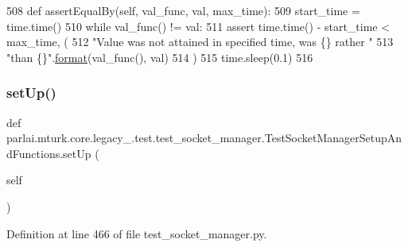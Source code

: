 \begin{DoxyCode}
508     \textcolor{keyword}{def }assertEqualBy(self, val\_func, val, max\_time):
509         start\_time = time.time()
510         \textcolor{keywordflow}{while} val\_func() != val:
511             \textcolor{keyword}{assert} time.time() - start\_time < max\_time, (
512                 \textcolor{stringliteral}{"Value was not attained in specified time, was \{\} rather "}
513                 \textcolor{stringliteral}{"than \{\}"}.\hyperlink{namespaceparlai_1_1chat__service_1_1services_1_1messenger_1_1shared__utils_a32e2e2022b824fbaf80c747160b52a76}{format}(val\_func(), val)
514             )
515             time.sleep(0.1)
516 
\end{DoxyCode}
\mbox{\label{classparlai_1_1mturk_1_1core_1_1legacy__2018_1_1test_1_1test__socket__manager_1_1TestSocketManagerSetupAndFunctions_ad928bb7729d4a18b720f995609d567d6}} 
\subsubsection{\texorpdfstring{set\+Up()}{setUp()}}
{\footnotesize\ttfamily def parlai.\+mturk.\+core.\+legacy\+\_.\+test.\+test\+\_\+socket\+\_\+manager.\+Test\+Socket\+Manager\+Setup\+And\+Functions.\+set\+Up (\begin{DoxyParamCaption}\item[{}]{self }\end{DoxyParamCaption})}



Definition at line 466 of file test\+\_\+socket\+\_\+manager.\+py.


